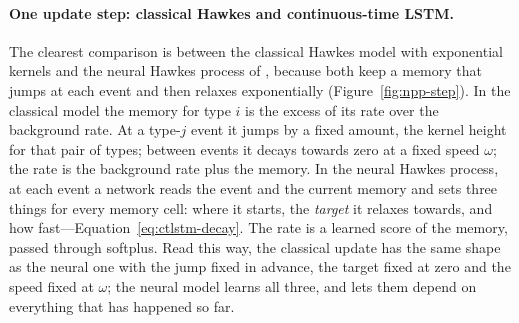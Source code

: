 \paragraph{One update step: classical Hawkes and continuous-time LSTM.} The clearest comparison is between the classical Hawkes model with exponential
kernels and the neural Hawkes process of \citet{mei2017}, because both keep a memory that jumps at each event
and then relaxes exponentially (Figure~\ref{fig:npp-step}). In the classical model the memory for type $i$ is the
excess of its rate over the background rate. At a type-$j$ event it jumps by a fixed amount, the kernel height
for that pair of types; between events it decays towards zero at a fixed speed $\omega$; the rate is the
background rate plus the memory. In the neural Hawkes process, at each event a network reads the event and the
current memory and sets three things for every memory cell: where it starts, the \emph{target} it relaxes
towards, and how fast---Equation~\eqref{eq:ctlstm-decay}. The rate is a learned score of the memory, passed
through softplus. Read this way, the classical update has the same shape as the neural one with the jump fixed
in advance, the target fixed at zero and the speed fixed at $\omega$; the neural model learns all three, and
lets them depend on everything that has happened so far.

